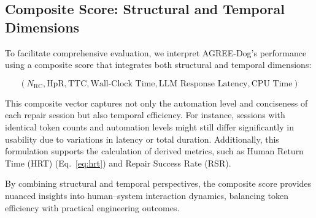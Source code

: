 \subsection{Composite Score: Structural and Temporal Dimensions}

To facilitate comprehensive evaluation, we interpret AGREE-Dog's performance using a composite score that integrates both structural and temporal dimensions:

\begin{equation}
\label{eq:composite-score}
(N_{\mathrm{RC}}, \text{HpR}, \text{TTC}, \text{Wall-Clock Time}, \text{LLM Response Latency}, \text{CPU Time})
\end{equation}

This composite vector captures not only the automation level and conciseness of each repair session but also temporal efficiency. For instance, sessions with identical token counts and automation levels might still differ significantly in usability due to variations in latency or total duration. Additionally, this formulation supports the calculation of derived metrics, such as Human Return Time (HRT) (Eq.~\ref{eq:hrt}) and Repair Success Rate (RSR).

By combining structural and temporal perspectives, the composite score provides nuanced insights into human–system interaction dynamics, balancing token efficiency with practical engineering outcomes.